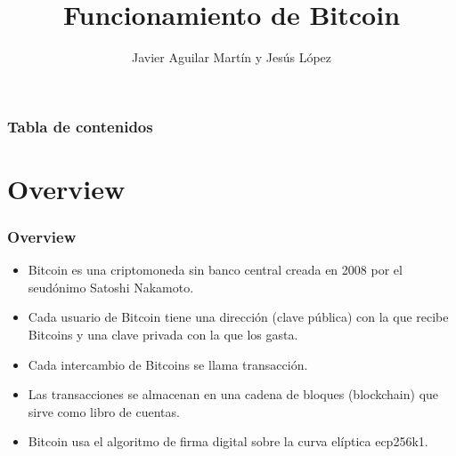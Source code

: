 \documentclass{beamer}
\title{Funcionamiento de Bitcoin}
\author{Javier Aguilar Martín y Jesús López}
\institute{Universidad de Sevilla}
\date{}
\theoremstyle{definition}
\begin{document}
\frame{\titlepage}
%
%
% 
% 
% 

% 



\newcommand{\seti}{\setcounter{saveenumi}{\value{enumi}}}
\newcommand{\conti}{\setcounter{enumi}{\value{saveenumi}}}

\begin{frame}
\frametitle{Tabla de contenidos}
\tableofcontents
\end{frame}


\section{Overview}
\begin{frame}
	\frametitle{Overview}
	\begin{itemize}
		\item<1-> Bitcoin es una criptomoneda sin banco central creada en 2008 por el seudónimo Satoshi Nakamoto.
		\item<2-> Cada usuario de Bitcoin tiene una dirección (clave pública) con la que recibe Bitcoins y una clave privada con la que los gasta.
		\item<3-> Cada intercambio de Bitcoins se llama transacción.
		\item<4-> Las transacciones se almacenan en una cadena de bloques (blockchain) que sirve como libro de cuentas.
		\item<5-> Bitcoin usa el algoritmo de firma digital sobre la curva elíptica ecp256k1.
	\end{itemize}
	
	
	
	
	
	
	
\end{frame}
\end{document}
